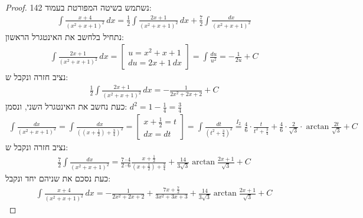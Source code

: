 \documentclass{article}
\begin{document}
	\begin{proof}
		נשתמש בשיטה המפורטת בעמוד 142:
		\begin{align*}
			\int \frac{x+4}{(x^2 + x + 1)^2} \, dx
			= \frac{1}{2} \int \frac{2x + 1}{(x^2 + x + 1)^2} \, dx
			+ \frac{7}{2} \int \frac{dx}{(x^2 + x + 1)^2}
		\end{align*}
		נתחיל בלחשב את האינטגרל הראשון:
		\begin{align*}
			\int \frac{2x + 1}{(x^2 + x + 1)^2} \, dx
			= \begin{bmatrix}
				u = x^2 + x + 1 \\
				du = 2x + 1 \, dx
			\end{bmatrix}
			= \int \frac{du}{u^2} = - \frac{1}{2u} + C
		\end{align*}
		נציב חזרה ונקבל ש:
		\begin{align*}
			\frac{1}{2} \int \frac{2x + 1}{(x^2 + x + 1)^2} \, dx
			= - \frac{1}{2x^2 + 2x + 2} + C
		\end{align*}
		כעת נחשב את האינטגרל השני, ונסמן: $d^2 = 1 - \frac{1}{4} = \frac{3}{4}$
		\begin{align*}
			\int \frac{dx}{(x^2 + x + 1)^2}
			= \int \frac{dx}{((x+\frac{1}{2})+ \frac{3}{4})^2}
			= \begin{bmatrix}
				x + \frac{1}{2} = t \\
				dx = dt
			\end{bmatrix}
			= \int \frac{dt}{(t^2 + \frac{3}{4})^2}
			\overset{I_2}= \frac{4}{6} \cdot \frac{t}{t^2 + \frac{3}{4}}
			 + \frac{4}{6} \cdot \frac{2}{\sqrt{3}} \cdot \arctan \frac{2t}{\sqrt{3}} + C
		\end{align*}
		נציב חזרה ונקבל ש:
		\begin{align*}
			\frac{7}{2} \int \frac{dx}{(x^2 + x + 1)^2}
			= \frac{7 \cdot 4}{2 \cdot 6} \frac{x + \frac{1}{2}}{(x + \frac{1}{2}) + \frac{3}{4}}
			+ \frac{14}{3\sqrt{3}} \arctan{\frac{2x + 1}{\sqrt{3}}} + C
		\end{align*}
		כעת נסכם את שניהם יחד ונקבל:
		\begin{align*}
			\int \frac{x+4}{(x^2 + x + 1)^2} \, dx
			= - \frac{1}{2x^2 + 2x + 2}
			+ \frac{7x + \frac{7}{2}}{3x^2 + 3x + 3}
			+ \frac{14}{3\sqrt{3}} \arctan{\frac{2x + 1}{\sqrt{3}}} + C
		\end{align*}
	\end{proof}
\end{document}
